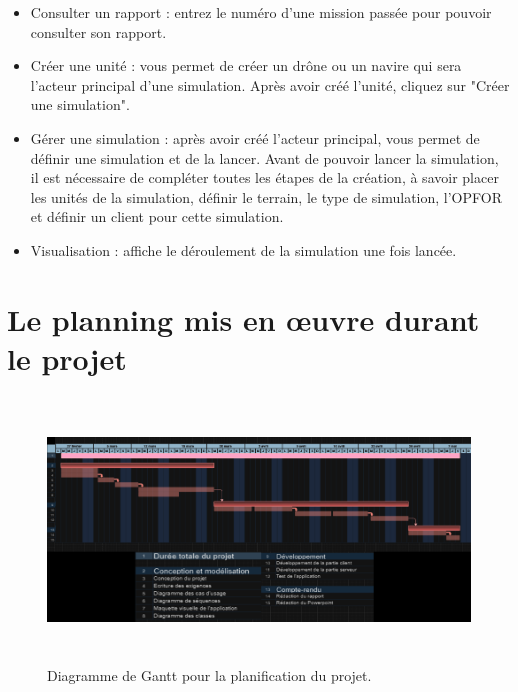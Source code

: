 \documentclass[12pt,a4paper]{scrartcl}
\theoremstyle{plain}
\theoremstyle{definition}
\theoremstyle{remark}
\begin{document}
	 \begin{itemize}
	 	\item Consulter un rapport : entrez le numéro d'une mission passée pour pouvoir consulter son rapport.
	 	\item Créer une unité : vous permet de créer un drône ou un navire qui sera l'acteur principal d'une simulation. Après avoir créé l'unité, cliquez sur "Créer une simulation".
	 	\item Gérer une simulation : après avoir créé l'acteur principal, vous permet de définir une simulation et de la lancer. Avant de pouvoir lancer la simulation, il est nécessaire de compléter toutes les étapes de la création, à savoir placer les unités de la simulation, définir le terrain, le type de simulation, l'OPFOR et définir un client pour cette simulation.
	 	\item Visualisation : affiche le déroulement de la simulation une fois lancée.
	 \end{itemize}
	 
	 
	 \section{Le planning mis en œuvre durant le projet}
	 	\begin{figure}[h]
	 	\centering
	 	\includegraphics[height=7cm]{img/Gant.png} 
	 	\caption{Diagramme de Gantt pour la planification du projet.}
	 \end{figure}
	 
	 
	
	
\end{document}
